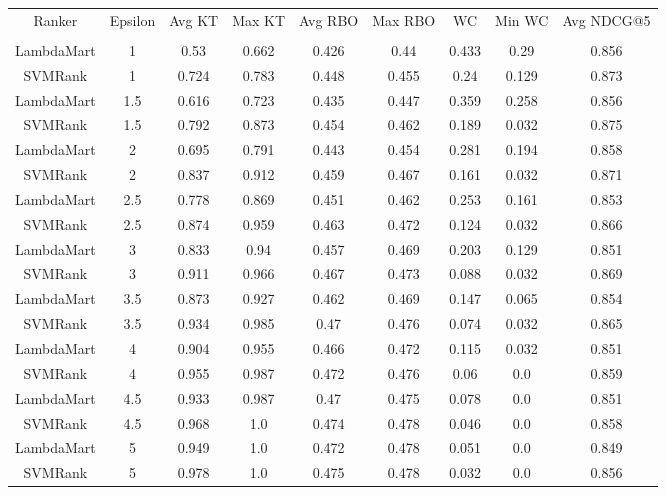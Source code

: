 \begin{longtable}{*{9}{c}}
Ranker & Epsilon & Avg KT & Max KT & Avg RBO & Max RBO & WC & Min WC & Avg NDCG@5\\\\ 
LambdaMart &  1 & 0.53 & 0.662 & 0.426 & 0.44 & 0.433 & 0.29 & 0.856 \\ 
SVMRank &  1 & 0.724 & 0.783 & 0.448 & 0.455 & 0.24 & 0.129 & 0.873 \\ 
LambdaMart &  1.5 & 0.616 & 0.723 & 0.435 & 0.447 & 0.359 & 0.258 & 0.856 \\ 
SVMRank &  1.5 & 0.792 & 0.873 & 0.454 & 0.462 & 0.189 & 0.032 & 0.875 \\ 
LambdaMart &  2 & 0.695 & 0.791 & 0.443 & 0.454 & 0.281 & 0.194 & 0.858 \\ 
SVMRank &  2 & 0.837 & 0.912 & 0.459 & 0.467 & 0.161 & 0.032 & 0.871 \\ 
LambdaMart &  2.5 & 0.778 & 0.869 & 0.451 & 0.462 & 0.253 & 0.161 & 0.853 \\ 
SVMRank &  2.5 & 0.874 & 0.959 & 0.463 & 0.472 & 0.124 & 0.032 & 0.866 \\ 
LambdaMart &  3 & 0.833 & 0.94 & 0.457 & 0.469 & 0.203 & 0.129 & 0.851 \\ 
SVMRank &  3 & 0.911 & 0.966 & 0.467 & 0.473 & 0.088 & 0.032 & 0.869 \\ 
LambdaMart &  3.5 & 0.873 & 0.927 & 0.462 & 0.469 & 0.147 & 0.065 & 0.854 \\ 
SVMRank &  3.5 & 0.934 & 0.985 & 0.47 & 0.476 & 0.074 & 0.032 & 0.865 \\ 
LambdaMart &  4 & 0.904 & 0.955 & 0.466 & 0.472 & 0.115 & 0.032 & 0.851 \\ 
SVMRank &  4 & 0.955 & 0.987 & 0.472 & 0.476 & 0.06 & 0.0 & 0.859 \\ 
LambdaMart &  4.5 & 0.933 & 0.987 & 0.47 & 0.475 & 0.078 & 0.0 & 0.851 \\ 
SVMRank &  4.5 & 0.968 & 1.0 & 0.474 & 0.478 & 0.046 & 0.0 & 0.858 \\ 
LambdaMart &  5 & 0.949 & 1.0 & 0.472 & 0.478 & 0.051 & 0.0 & 0.849 \\ 
SVMRank &  5 & 0.978 & 1.0 & 0.475 & 0.478 & 0.032 & 0.0 & 0.856 \\ 
\end{longtable}